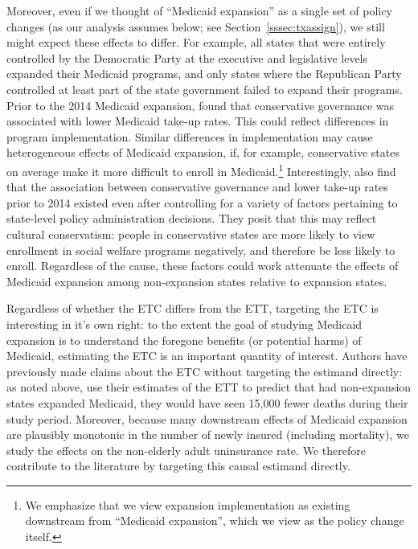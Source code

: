 \documentclass[aoas]{imsart}
\theoremstyle{plain}
\theoremstyle{remark}
\begin{document}
Moreover, even if we thought of ``Medicaid expansion'' as a single set of policy changes (as our analysis assumes below; see Section~\ref{sssec:txassign}), we still might expect these effects to differ. For example, all states that were entirely controlled by the Democratic Party at the executive and legislative levels expanded their Medicaid programs, and only states where the Republican Party controlled at least part of the state government failed to expand their programs. Prior to the 2014 Medicaid expansion, \cite{sommers2012understanding} found that conservative governance was associated with lower Medicaid take-up rates. This could reflect differences in program implementation. Similar differences in implementation may cause heterogeneous effects of Medicaid expansion, if, for example, conservative states on average make it more difficult to enroll in Medicaid.\footnote{We emphasize that we view expansion implementation as existing downstream from ``Medicaid expansion'', which we view as the policy change itself.} Interestingly, \cite{sommers2012understanding} also find that the association between conservative governance and lower take-up rates prior to 2014 existed even after controlling for a variety of factors pertaining to state-level policy administration decisions. They posit that this may reflect cultural conservatism: people in conservative states are more likely to view enrollment in social welfare programs negatively, and therefore be less likely to enroll. Regardless of the cause, these factors could work attenuate the effects of Medicaid expansion among non-expansion states relative to expansion states. 

Regardless of whether the ETC differs from the ETT, targeting the ETC is interesting in it's own right: to the extent the goal of studying Medicaid expansion is to understand the foregone benefits (or potential harms) of Medicaid, estimating the ETC is an important quantity of interest. Authors have previously made claims about the ETC without targeting the estimand directly: as noted above, \cite{miller2019medicaid} use their estimates of the ETT to predict that had non-expansion states expanded Medicaid, they would have seen 15,000 fewer deaths during their study period. Moreover, because many downstream effects of Medicaid expansion are plausibly monotonic in the number of newly insured (including mortality), we study the effects on the non-elderly adult uninsurance rate. We therefore contribute to the literature by targeting this causal estimand directly.
\end{document}
